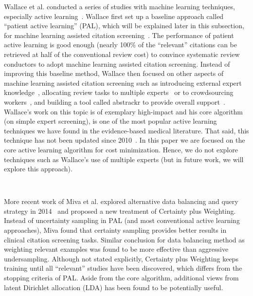 \documentclass{svjour3}
\theoremstyle{break}
\newcommand{\respto}[1]{
\fcolorbox{black}{black!15}{
\label{response:#1}
\bf
  \scriptsize R-{#1}}~
}
\begin{document}
Wallace et al. conducted a series of studies
with machine learning techniques, especially active
learning~\cite{wallace2010semi,wallace2010active,wallace2011should,wallace2012deploying,wallace2013active,wallace2013modernizing,nguyen2015combining}. Wallace
first set up a baseline approach called ``patient active learning'' (PAL), which will be explained later in this subsection, for machine learning assisted citation screening~\cite{wallace2010semi}. The performance of patient active learning is good enough (nearly 100\% of the ``relevant''
citations can be retrieved at half of the conventional review cost) to convince
systematic review conductors to adopt machine learning assisted citation
screening. Instead of improving this baseline method, Wallace then focused on other aspects of machine learning assisted citation screening such as introducing external expert knowledge~\cite{wallace2010active}, allocating review tasks to multiple experts~\cite{wallace2011should} or to crowdsourcing workers~\cite{nguyen2015combining}, and building a tool called abstrackr to provide overall support~\cite{wallace2012deploying}. Wallace's work on this topic is of exemplary high-impact and his core algorithm   (on simple expert screening),   is one of the most popular active learning techniques we have found in the evidence-based medical literature. That said, this technique has not been updated since 2010~\cite{wallace2010semi}. In this paper we are focused on the core active learning algorithm for cost minimization. Hence, we do not explore techniques such as Wallace's use of multiple experts (but in future work, we will explore this approach).

\respto{1a1}
More recent work of Miva et al. explored alternative data balancing and query strategy in 2014~\cite{miwa2014reducing} and proposed a new treatment of Certainty plus Weighting. Instead of uncertainty sampling in PAL (and most conventional active learning approaches), Miva found that certainty sampling provides better results in clinical citation screening tasks. Similar conclusion for data balancing method as weighting relevant examples was found to be more effective than aggressive undersampling. Although not stated explicitly, Certainty plus Weighting keeps training until all ``relevant'' studies have been discovered, which differs from the stopping criteria of PAL. Aside from the core algorithm, additional views from latent Dirichlet allocation (LDA) has been found to be potentially useful.
\end{document}
